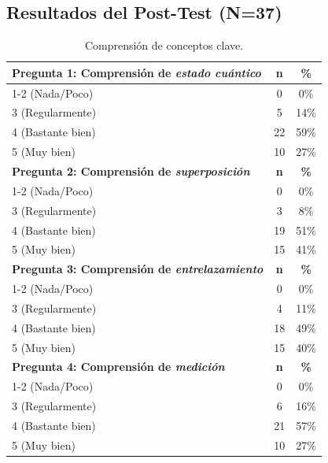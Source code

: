 \documentclass[10pt,a4paper]{article}
\begin{document}
\newpage
\subsection{Resultados del Post-Test (N=37)}


\begin{table}[h!]
\centering
\caption{Comprensión de conceptos clave.}
\begin{tabular}{|l|c|c|}
\hline
\textbf{Pregunta 1: Comprensión de \textit{estado cuántico}} & \textbf{n} & \textbf{\%} \\
\hline
1-2 (Nada/Poco) & 0 & 0\% \\
3 (Regularmente) & 5 & 14\% \\
4 (Bastante bien) & 22 & 59\% \\
5 (Muy bien) & 10 & 27\% \\
\hline
\textbf{Pregunta 2: Comprensión de \textit{superposición}} & \textbf{n} & \textbf{\%} \\
\hline
1-2 (Nada/Poco) & 0 & 0\% \\
3 (Regularmente) & 3 & 8\% \\
4 (Bastante bien) & 19 & 51\% \\
5 (Muy bien) & 15 & 41\% \\
\hline
\textbf{Pregunta 3: Comprensión de \textit{entrelazamiento}} & \textbf{n} & \textbf{\%} \\
\hline
1-2 (Nada/Poco) & 0 & 0\% \\
3 (Regularmente) & 4 & 11\% \\
4 (Bastante bien) & 18 & 49\% \\
5 (Muy bien) & 15 & 40\% \\
\hline
\textbf{Pregunta 4: Comprensión de \textit{medición}} & \textbf{n} & \textbf{\%} \\
\hline
1-2 (Nada/Poco) & 0 & 0\% \\
3 (Regularmente) & 6 & 16\% \\
4 (Bastante bien) & 21 & 57\% \\
5 (Muy bien) & 10 & 27\% \\
\hline
\end{tabular}
\end{table}
\end{document}
